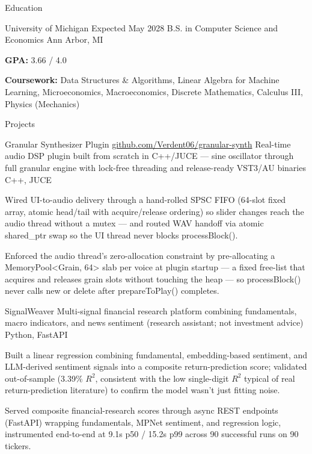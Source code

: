 \documentclass[
	11pt
]{../../../template}
\begin{document}
	\begin{rSection}{E}{ducation}
		\begin{rSectionEntry}
			{University of Michigan}
			{Expected May 2028}
			{B.S. in Computer Science and Economics}
			{}
			{Ann Arbor, MI}

			\item \textbf{GPA:} 3.66 / 4.0
			\item \textbf{Coursework:} Data Structures \& Algorithms, Linear Algebra for Machine Learning, Microeconomics, Macroeconomics, Discrete Mathematics, Calculus III, Physics (Mechanics)
		\end{rSectionEntry}
	\end{rSection}

	\begin{rSection}{P}{rojects}
		\begin{rSectionEntry}
			{Granular Synthesizer Plugin}
			{\href{https://github.com/Verdent06/granular-synth}{github.com/Verdent06/granular-synth}}
			{Real-time audio DSP plugin built from scratch in C++/JUCE --- sine oscillator through full granular engine with lock-free threading and release-ready VST3/AU binaries}
			{C++, JUCE}
			{}

			\item Wired UI-to-audio delivery through a hand-rolled SPSC FIFO (64-slot fixed array, atomic head/tail with acquire/release ordering) so slider changes reach the audio thread without a mutex --- and routed WAV handoff via atomic shared\_ptr swap so the UI thread never blocks processBlock().
			\item Enforced the audio thread's zero-allocation constraint by pre-allocating a MemoryPool<Grain, 64> slab per voice at plugin startup --- a fixed free-list that acquires and releases grain slots without touching the heap --- so processBlock() never calls new or delete after prepareToPlay() completes.
		\end{rSectionEntry}

		\begin{rSectionEntry}
			{SignalWeaver}
			{}
			{Multi-signal financial research platform combining fundamentals, macro indicators, and news sentiment (research assistant; not investment advice)}
			{Python, FastAPI}
			{}

			\item Built a linear regression combining fundamental, embedding-based sentiment, and LLM-derived sentiment signals into a composite return-prediction score; validated out-of-sample (3.39\% $R^2$, consistent with the low single-digit $R^2$ typical of real return-prediction literature) to confirm the model wasn't just fitting noise.
			\item Served composite financial-research scores through async REST endpoints (FastAPI) wrapping fundamentals, MPNet sentiment, and regression logic, instrumented end-to-end at 9.1s p50 / 15.2s p99 across 90 successful runs on 90 tickers.
		\end{rSectionEntry}
	\end{rSection}
\end{document}
